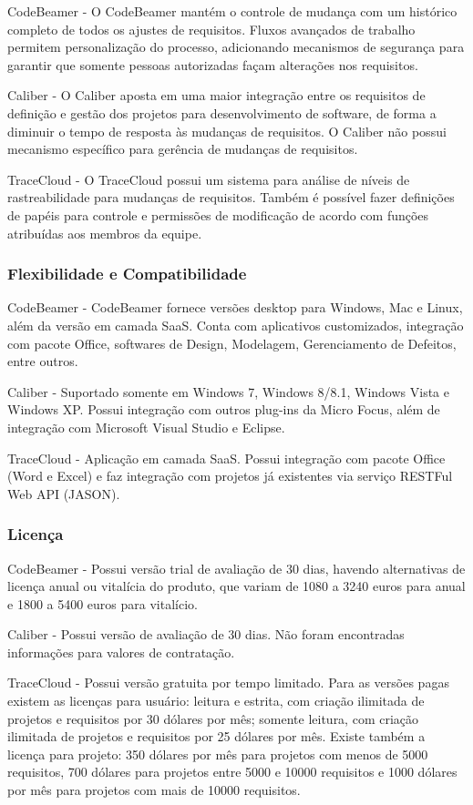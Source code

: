 CodeBeamer - O CodeBeamer mantém o controle de mudança com um histórico completo de todos os ajustes de requisitos. Fluxos avançados de trabalho permitem personalização do processo, adicionando mecanismos de segurança para garantir que somente pessoas autorizadas façam alterações nos requisitos.

Caliber - O Caliber aposta em uma maior integração entre os requisitos de definição e gestão dos projetos para desenvolvimento de software, de forma a diminuir o tempo de resposta às mudanças de requisitos. O Caliber não possui mecanismo específico para gerência de mudanças de requisitos.

TraceCloud - O TraceCloud possui um sistema para análise de níveis de rastreabilidade para mudanças de requisitos. Também é possível fazer definições de papéis para controle e permissões de modificação de acordo com funções atribuídas aos membros da equipe.

\subsubsection{Flexibilidade e Compatibilidade}

CodeBeamer - CodeBeamer fornece versões desktop para Windows, Mac e Linux, além da versão em camada SaaS. Conta com aplicativos customizados, integração com pacote Office, softwares de Design, Modelagem, Gerenciamento de Defeitos, entre outros.

Caliber - Suportado somente em Windows 7, Windows 8/8.1, Windows Vista e Windows XP. Possui integração com outros plug-ins da Micro Focus, além de integração com Microsoft Visual Studio e Eclipse.

TraceCloud - Aplicação em camada SaaS. Possui integração com pacote Office (Word e Excel) e faz integração com projetos já existentes via serviço RESTFul Web API (JASON).

\subsubsection{Licença}

CodeBeamer - Possui versão trial de avaliação de 30 dias, havendo alternativas de licença anual ou vitalícia do produto, que variam de 1080 a 3240 euros para anual e 1800 a 5400 euros para vitalício.

Caliber - Possui versão de avaliação de 30 dias. Não foram encontradas informações para valores de contratação.

TraceCloud - Possui versão gratuita por tempo limitado. Para as versões pagas existem as licenças para usuário: leitura e estrita, com criação ilimitada de projetos e requisitos por 30 dólares por mês; somente leitura, com criação ilimitada de projetos e requisitos por 25 dólares por mês. Existe também a licença para projeto: 350 dólares por mês para projetos com menos de 5000 requisitos, 700 dólares para projetos entre 5000 e 10000 requisitos e 1000 dólares por mês para projetos com mais de 10000 requisitos.

